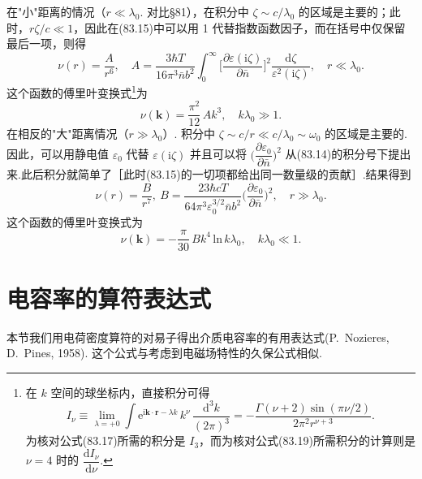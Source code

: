 在"小"距离的情况（$r\ll\lambda_0$. 对比§81），在积分中 $\zeta\sim c/\lambda_0$ 的区域是主要的；此时，$r\zeta/c\ll 1$，因此在(83.15)中可以用 1 代替指数函数因子，而在括号中仅保留最后一项，则得
\begin{equation}
  \nu(r)=\frac{A}{r^{6}},\quad A=\frac{3\hbar T}{16\pi^{3}\bar{n}b^{2}}\int_{0}^{\infty}\biggl[\frac{\partial\varepsilon(\mathrm{i}\zeta)}{\partial\bar{n}}\biggr]^{2}\frac{\mathrm{d}\zeta}{\varepsilon^{2}(\mathrm{i}\zeta)},\quad r\ll\lambda_0.
\end{equation}
这个函数的傅里叶变换式\footnote{在 $k$ 空间的球坐标内，直接积分可得
\begin{equation*}
  I_{\nu}\equiv\operatorname*{lim}_{\lambda=+0}\int\mathrm{e}^{\mathrm{i}\bm{k}\cdot\bm{r}-\lambda k}\,k^{\nu}\,\frac{\mathrm{d}^{3}k}{(2\pi)^{3}}=-\frac{\Gamma(\nu+2)\sin(\pi\nu/2)}{2\pi^{2}r^{\nu+3}}.
\end{equation*}
为核对公式(83.17)所需的积分是 $I_3$，而为核对公式(83.19)所需积分的计算则是 $\nu=4$ 时的 $\dfrac{\mathrm{d}I_{\nu}}{\mathrm{d}\nu}$.}为
\begin{equation}
  \nu(\bm{k})=\frac{\pi^{2}}{12}\,Ak^{3},\quad k\lambda_0\gg 1.
\end{equation}
在相反的"大"距离情况（$r\gg\lambda_0$）. 积分中 $\zeta\sim c/r\ll c/\lambda_0\sim\omega_0$ 的区域是主要的.因此，可以用静电值 $\varepsilon_0$ 代替 $\varepsilon(\mathrm{i}\zeta)$ 并且可以将 $\biggl(\dfrac{\partial\varepsilon_0}{\partial\bar{n}}\biggr)^{2}$ 从(83.14)的积分号下提出来.此后积分就简单了［此时(83.15)的一切项都给出同一数量级的贡献］.结果得到
\begin{equation}
  \nu(r)=\frac{B}{r^{7}},\ B=\frac{23\hbar c T}{64\pi^{3}\varepsilon_0^{3/2}\bar{n}b^{2}}\biggl(\frac{\partial\varepsilon_0}{\partial\bar{n}}\biggr)^{2},\quad r\gg\lambda_0.
\end{equation}
这个函数的傅里叶变换式为
\begin{equation}
  \nu(\bm{k})=-\frac{\pi}{30}\,Bk^{4}\,\mathrm{ln}\,k\lambda_0,\quad k\lambda_0\ll 1.
\end{equation}

\section{电容率的算符表达式}

本节我们用电荷密度算符的对易子得出介质电容率的有用表达式(P.~Nozieres, D.~Pines, 1958). 这个公式与考虑到电磁场特性的久保公式相似.

